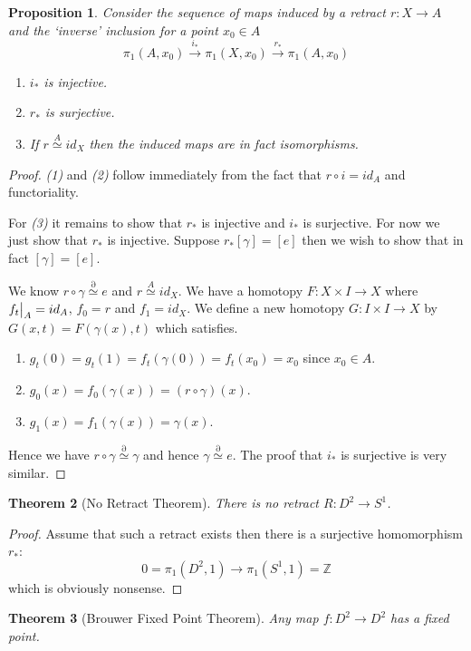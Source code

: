 \documentclass[11pt]{article}
\newcommand{\homrel}{\stackrel{\partial}{\simeq}}
\newcommand{\homrelset}[1]{\stackrel{#1}{\simeq}}
\newcommand\restr[2]{{%
  \left.\kern-\nulldelimiterspace %
  #1 %
  \vphantom{\big|} %
  \right|_{#2} %
  }}
\newcommand{\Z}{\mathbb{Z}}
\newtheorem{theorem}{Theorem}[section]
\newtheorem{prop}[theorem]{Proposition}
\begin{document}
\begin{prop}
Consider the sequence of maps induced by a retract $r:X\to A$ and the `inverse' inclusion for a point $x_0\in A$
\[
	\pi_1(A,x_0)\xrightarrow{i_\ast}\pi_1(X, x_0)\xrightarrow{r_\ast}\pi_1(A, x_0)
\]
\begin{enumerate}
	\item $i_\ast$ is injective.
	\item $r_\ast$ is surjective.
	\item If $r\homrelset{A}id_X$ then the induced maps are in fact isomorphisms.
\end{enumerate}
\end{prop}
\begin{proof}
\textit{(1)} and \textit{(2)} follow immediately from the fact that $r\circ i = id_A$ and functoriality.

For \textit{(3)} it remains to show that $r_\ast$ is injective and $i_\ast$ is surjective.
For now we just show that $r_\ast$ is injective.
Suppose $r_\ast[\gamma]=[e]$ then we wish to show that in fact $[\gamma]=[e]$.

We know $r \circ \gamma \homrel e$ and $r \homrelset{A} id_X$.
We have a homotopy $F:X\times I \to X$ where $\restr{f_t}{A}=id_A$, $f_0=r$ and $f_1=id_X$.
We define a new homotopy $G:I\times I \to X$ by $G(x, t)= F(\gamma(x), t)$ which satisfies.
\begin{enumerate}[label=(\roman*)]
	\item $g_t(0)=g_t(1)=f_t(\gamma(0))=f_t(x_0)=x_0$ since $x_0\in A$.
	\item $g_0(x)=f_0(\gamma(x))=(r \circ \gamma)(x)$.
	\item $g_1(x)=f_1(\gamma(x))=\gamma(x)$.
\end{enumerate}
Hence we have $r\circ \gamma \homrel \gamma$ and hence $\gamma \homrel e$.
The proof that $i_\ast$ is surjective is very similar.
\end{proof}

\begin{theorem}[No Retract Theorem]
There is no retract $R:D^2\to S^1$.
\end{theorem}

\begin{proof}
Assume that such a retract exists then there is a surjective homomorphism $r_\ast$:
\[
	0=\pi_1(D^2,1)\to\pi_1(S^1,1)=\Z
\]
which is obviously nonsense.
\end{proof}

\begin{theorem}[Brouwer Fixed Point Theorem]
Any map $f:D^2\to D^2$ has a fixed point.
\end{theorem}
\end{document}
